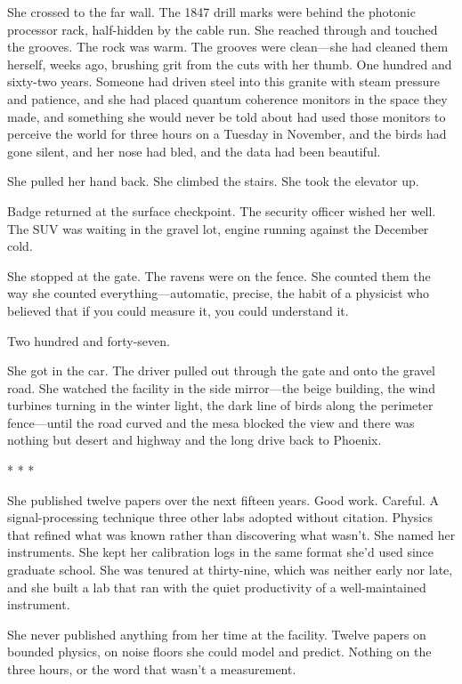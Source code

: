\documentclass[12pt]{article}
\newcommand{\scenebreak}{\begin{center}* * *\end{center}}
\begin{document}
She crossed to the far wall. The 1847 drill marks were behind the photonic processor rack, half-hidden by the cable run. She reached through and touched the grooves. The rock was warm. The grooves were clean---she had cleaned them herself, weeks ago, brushing grit from the cuts with her thumb. One hundred and sixty-two years. Someone had driven steel into this granite with steam pressure and patience, and she had placed quantum coherence monitors in the space they made, and something she would never be told about had used those monitors to perceive the world for three hours on a Tuesday in November, and the birds had gone silent, and her nose had bled, and the data had been beautiful.

She pulled her hand back. She climbed the stairs. She took the elevator up.

Badge returned at the surface checkpoint. The security officer wished her well. The SUV was waiting in the gravel lot, engine running against the December cold.

She stopped at the gate. The ravens were on the fence. She counted them the way she counted everything---automatic, precise, the habit of a physicist who believed that if you could measure it, you could understand it.

Two hundred and forty-seven.

She got in the car. The driver pulled out through the gate and onto the gravel road. She watched the facility in the side mirror---the beige building, the wind turbines turning in the winter light, the dark line of birds along the perimeter fence---until the road curved and the mesa blocked the view and there was nothing but desert and highway and the long drive back to Phoenix.

\scenebreak

She published twelve papers over the next fifteen years. Good work. Careful. A signal-processing technique three other labs adopted without citation. Physics that refined what was known rather than discovering what wasn't. She named her instruments. She kept her calibration logs in the same format she'd used since graduate school. She was tenured at thirty-nine, which was neither early nor late, and she built a lab that ran with the quiet productivity of a well-maintained instrument.

She never published anything from her time at the facility. Twelve papers on bounded physics, on noise floors she could model and predict. Nothing on the three hours, or the word that wasn't a measurement.
\end{document}

